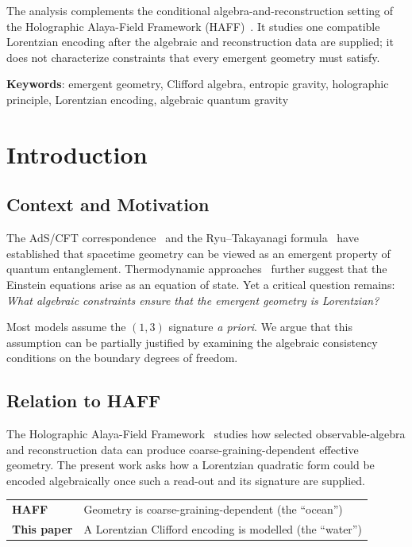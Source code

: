 \documentclass[12pt,a4paper,openany]{book}
\begin{document}
The analysis complements the conditional algebra-and-reconstruction setting of the Holographic Alaya-Field Framework (HAFF)~\cite{Liu2026PaperA,Liu2026PaperB}.  It studies one compatible Lorentzian encoding after the algebraic and reconstruction data are supplied; it does not characterize constraints that every emergent geometry must satisfy.

\medskip
\noindent\textbf{Keywords}: emergent geometry, Clifford algebra, entropic gravity, holographic principle, Lorentzian encoding, algebraic quantum gravity


\section{Introduction}
\label{Q-A-sec:intro}

\subsection{Context and Motivation}

The AdS/CFT correspondence~\cite{Maldacena1999} and the Ryu--Takayanagi formula~\cite{RyuTakayanagi2006} have established that spacetime geometry can be viewed as an emergent property of quantum entanglement.
Thermodynamic approaches~\cite{Jacobson1995,Verlinde2011} further suggest that the Einstein equations arise as an equation of state.
Yet a critical question remains: \textit{What algebraic constraints ensure that the emergent geometry is Lorentzian?}

Most models assume the $(1,3)$ signature \textit{a priori}.
We argue that this assumption can be partially justified by examining the algebraic consistency conditions on the boundary degrees of freedom.

\subsection{Relation to HAFF}

The Holographic Alaya-Field Framework~\cite{Liu2026PaperA,Liu2026PaperB} studies how selected observable-algebra and reconstruction data can produce coarse-graining-dependent effective geometry.
The present work asks how a Lorentzian quadratic form could be encoded algebraically once such a read-out and its signature are supplied.

\begin{center}
\begin{tabular}{ll}
\textbf{HAFF} & Geometry is coarse-graining-dependent (the ``ocean'') \\
\textbf{This paper} & A Lorentzian Clifford encoding is modelled (the ``water'')
\end{tabular}
\end{center}
\end{document}
